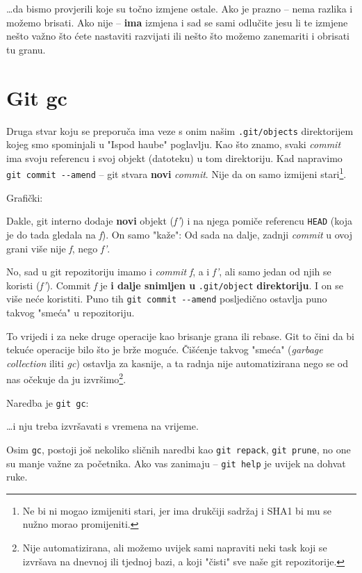 \dots{}da bismo provjerili koje su točno izmjene ostale.
Ako je prazno -- nema razlika i možemo brisati.
Ako nije -- \textbf{ima} izmjena i sad se sami odlučite jesu li te izmjene nešto važno što ćete nastaviti razvijati ili nešto što možemo zanemariti i obrisati tu granu.

\section*{Git gc}

Druga stvar koju se preporuča ima veze s onim našim \verb+.git/objects+ direktorijem kojeg smo spominjali u "Ispod haube" poglavlju.
Kao što znamo, svaki \emph{commit} ima svoju referencu i svoj objekt (datoteku) u tom direktoriju.
Kad napravimo \verb+git commit --amend+ -- git stvara \textbf{novi} \emph{commit}.
Nije da on samo izmijeni stari\footnote{Ne bi ni mogao izmijeniti stari, jer ima drukčiji sadržaj i SHA1 bi mu se nužno morao promijeniti.}.

Grafički:



Dakle, git interno dodaje \textbf{novi} objekt (\emph{f'}) i na njega pomiče referencu \verb+HEAD+ (koja je do tada gledala na \emph f).
On samo "kaže": Od sada na dalje, zadnji \emph{commit} u ovoj grani više nije \emph f, nego \emph{f'}.

No, sad u git repozitoriju imamo i \emph{commit} \emph f, a i \emph{f'}, ali samo jedan od njih se koristi (\emph{f'}).
Commit \emph f je \textbf{i dalje snimljen u} \verb+.git/object+ \textbf{direktoriju}.
I on se više neće koristiti.
Puno tih \verb+git commit --amend+ posljedično ostavlja puno takvog "smeća" u repozitoriju.

To vrijedi i za neke druge operacije kao brisanje grana ili rebase.
Git to čini da bi tekuće operacije bilo što je brže moguće.
Čišćenje takvog "smeća" (\emph{garbage collection} iliti \emph{gc}) ostavlja za kasnije, a ta radnja nije automatizirana nego se od nas očekuje da ju izvršimo\footnote{Nije automatizirana, ali možemo uvijek sami napraviti neki task koji se izvršava na dnevnoj ili tjednoj bazi, a koji "čisti" sve naše git repozitorije.}.

Naredba je \verb+git gc+:



\dots{}i nju treba izvršavati s vremena na vrijeme.

Osim \verb+gc+, postoji još nekoliko sličnih naredbi kao \verb+git repack+, \verb+git prune+, no one su manje važne za početnika.
Ako vas zanimaju -- \verb+git help+ je uvijek na dohvat ruke.


